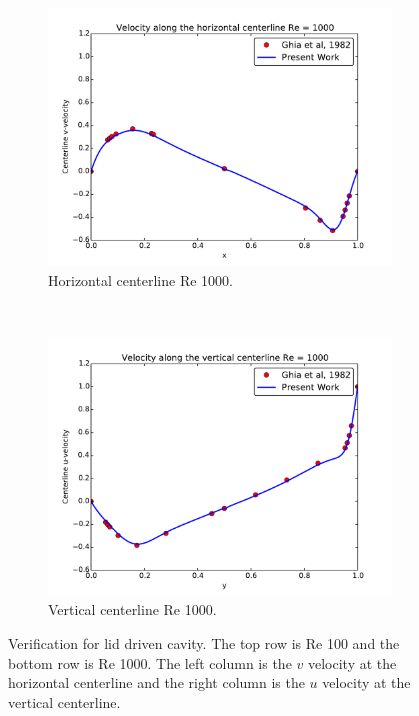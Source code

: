 \begin{figure}[!htb]
	\begin{subfigure}{0.4\textwidth}
		\includegraphics[width=\linewidth]{ldc_horizontal_1000}
		\caption{Horizontal centerline Re 1000.}		
	\end{subfigure}
	~
	\begin{subfigure}{0.4\textwidth}
		\includegraphics[width=\linewidth]{ldc_vertical_1000}
		\caption{Vertical centerline Re 1000.}		
	\end{subfigure}
	\caption{Verification for lid driven cavity. The top row is Re 100 and the bottom row is Re 1000. The left column is the $v$ velocity at the horizontal centerline and the right column is the $u$ velocity at the vertical centerline.}
	\label{fig:ldc}
\end{figure}

